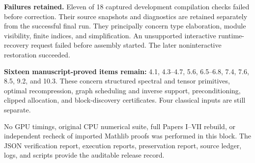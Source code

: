 \documentclass[11pt]{article}
\begin{document}
\textbf{Failures retained.} Eleven of 18 captured development compilation checks failed before correction. Their source snapshots and diagnostics are retained separately from the successful final run. They principally concern type elaboration, module visibility, finite indices, and simplification. An unsupported interactive runtime-recovery request failed before assembly started. The later noninteractive restoration succeeded.

\textbf{Sixteen manuscript-proved items remain:} 4.1, 4.3--4.7, 5.6, 6.5--6.8, 7.4, 7.6, 8.5, 9.2, and 10.3. These concern structured spectral and tensor primitives, optimal recompression, graph scheduling and inverse support, preconditioning, clipped allocation, and block-discovery certificates. Four classical inputs are still separate.

No GPU timings, original CPU numerical suite, full Papers I--VII rebuild, or independent recheck of imported Mathlib proofs was performed in this block. The JSON verification report, execution reports, preservation report, source ledger, logs, and scripts provide the auditable release record.
\end{document}

